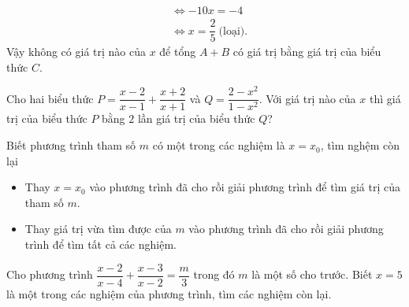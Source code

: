{\begin{vd}
{\begin{align*}
		&\Leftrightarrow -10x = -4\\
		&\Leftrightarrow x = \dfrac{2}{5}\ \text{(loại).} 
		\end{align*}
		Vậy không có giá trị nào của $x$ để tổng $A + B$ có giá trị bằng giá trị của biểu thức $C$.
	}
\end{vd}
\begin{vd}%
	Cho hai biểu thức $P = \dfrac{x - 2}{x - 1} + \dfrac{x + 2}{x + 1}$ và $Q = \dfrac{2 - x^2}{1 - x^2}$. Với giá trị nào của $x$ thì giá trị của biểu thức $P$ bằng $2$ lần giá trị của biểu thức $Q$?
\end{vd}
\begin{dang}{Biết phương trình tham số $m$ có một trong các nghiệm là $x = x_0$, tìm nghệm còn lại}
	\begin{itemize}
		\item Thay $x = x_0$ vào phương trình đã cho rồi giải phương trình để tìm giá trị của tham số $m$.
		\item Thay giá trị vừa tìm được của $m$ vào phương trình đã cho rồi giải phương trình để tìm tất cả các nghiệm.
	\end{itemize}
\end{dang}
\begin{vd}%
	Cho phương trình $\dfrac{x - 2}{x - 4} + \dfrac{x - 3}{x - 2} = \dfrac{m}{3}$ trong đó $m$ là một số cho trước. Biết $x = 5$ là một trong các nghiệm của phương trình, tìm các nghiệm còn lại.
\end{vd}}
